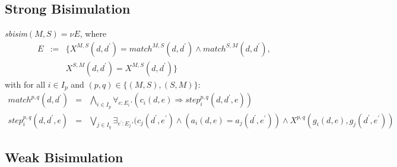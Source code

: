 \documentclass{article}
\begin{document}
\subsection{Strong Bisimulation}

\emph{sbisim}$(M,S)=\nu E$, where%
\[
\begin{array}{ccl}
E & := & \{X^{M,S}(d,d^{\prime })=match^{M,S}(d,d^{\prime })\wedge
match^{S,M}(d,d^{\prime }), \\
&  & X^{S,M}(d,d^{\prime })=X^{M,S}(d,d^{\prime })\}%
\end{array}%
\]%
with for all $i\in I_{p}$ and $(p,q)\in \{(M,S),(S,M)\}$:%
\begin{eqnarray*}
match^{p,q}(d,d^{\prime }) &=&\bigwedge\limits_{i\in I_{p}}\forall
_{e:E_{i}}.(c_{i}(d,e)\Rightarrow step_{i}^{p,q}(d,d^{\prime },e)) \\
step_{i}^{p,q}(d,d^{\prime },e) &=&\bigvee\limits_{j\in I_{q}}\exists
_{e^{\prime }:E_{j}}.(c_{j}(d^{\prime },e^{\prime })\wedge
(a_{i}(d,e)=a_{j}(d^{\prime },e^{\prime }))\wedge
X^{p,q}(g_{i}(d,e),g_{j}(d^{\prime },e^{\prime }))
\end{eqnarray*}

\subsection{Weak Bisimulation}
\end{document}
